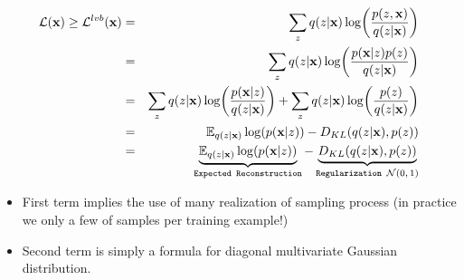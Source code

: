 \documentclass[xcolor=pdftex,dvipsnames,table,mathserif]{beamer}
\begin{document}
\begin{frame}
\begin{eqnarray*}
 \mathcal{L}(\mathbf{x}) \geq \mathcal{L}^{lvb}(\mathbf{x}) &=& \sum_{z} q(z|\mathbf{x}) \log(\frac{p(z,\mathbf{x}) }{q(z|\mathbf{x})}) \\
 &=& \sum_{z} q(z|\mathbf{x}) \log(\frac{p(\mathbf{x} | z) p(z)}{q(z|\mathbf{x})}) \\
 &=& \sum_{z} q(z|\mathbf{x}) \log(\frac{p(\mathbf{x} | z)}{q(z|\mathbf{x})}) +  \sum_{z} q(z|\mathbf{x}) \log(\frac{p(z)}{q(z|\mathbf{x})}) \\
 &=& \mathbb{E}_{q(z|\mathbf{x})} \log(p(\mathbf{x} | z)) -D_{KL}(q(z|\mathbf{x}),p(z))\\
  &=& \underbrace{\mathbb{E}_{q(z|\mathbf{x})} \log(p(\mathbf{x} | z))}_{\texttt{Expected Reconstruction}} - \underbrace{D_{KL}(q(z|\mathbf{x}),p(z))}_{\texttt{Regularization $\mathcal{N}(0,1)$}}\\
\end{eqnarray*}
\begin{itemize}
\item First term implies the use of many realization of sampling process (in practice we only a few of samples per training example!)
\item Second term is simply a formula for diagonal multivariate Gaussian distribution.
\end{itemize}
\end{frame}
\end{document}
